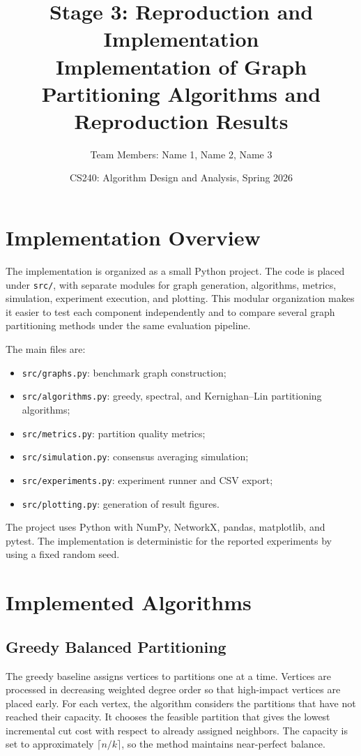 \documentclass[11pt]{article}
\title{\textbf{Stage 3: Reproduction and Implementation}\\
Implementation of Graph Partitioning Algorithms and Reproduction Results}
\author{Team Members: Name 1, Name 2, Name 3}
\date{CS240: Algorithm Design and Analysis, Spring 2026}
\begin{document}
\maketitle

\section{Implementation Overview}

The implementation is organized as a small Python project. The code is placed
under \texttt{src/}, with separate modules for graph generation, algorithms,
metrics, simulation, experiment execution, and plotting. This modular
organization makes it easier to test each component independently and to
compare several graph partitioning methods under the same evaluation pipeline.

The main files are:
\begin{itemize}
    \item \texttt{src/graphs.py}: benchmark graph construction;
    \item \texttt{src/algorithms.py}: greedy, spectral, and Kernighan--Lin
    partitioning algorithms;
    \item \texttt{src/metrics.py}: partition quality metrics;
    \item \texttt{src/simulation.py}: consensus averaging simulation;
    \item \texttt{src/experiments.py}: experiment runner and CSV export;
    \item \texttt{src/plotting.py}: generation of result figures.
\end{itemize}

The project uses Python with NumPy, NetworkX, pandas, matplotlib, and pytest.
The implementation is deterministic for the reported experiments by using a
fixed random seed.

\section{Implemented Algorithms}

\subsection{Greedy Balanced Partitioning}

The greedy baseline assigns vertices to partitions one at a time. Vertices are
processed in decreasing weighted degree order so that high-impact vertices are
placed early. For each vertex, the algorithm considers the partitions that have
not reached their capacity. It chooses the feasible partition that gives the
lowest incremental cut cost with respect to already assigned neighbors. The
capacity is set to approximately $\lceil n/k\rceil$, so the method maintains
near-perfect balance.
\end{document}
